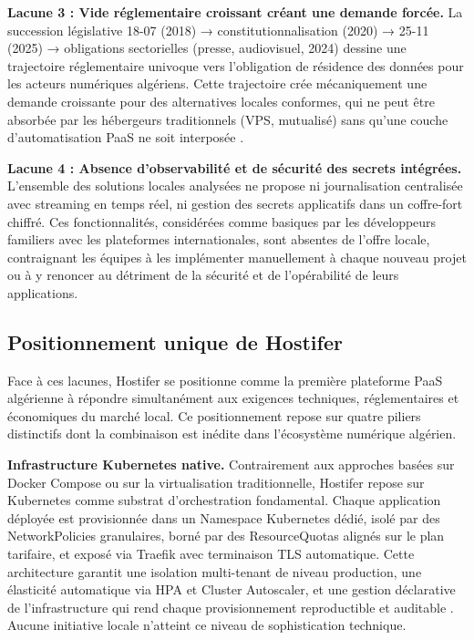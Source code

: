 \textbf{Lacune 3 : Vide réglementaire croissant créant une demande forcée.} La succession législative 18-07 (2018) → constitutionnalisation (2020) → 25-11 (2025) → obligations sectorielles (presse, audiovisuel, 2024) dessine une trajectoire réglementaire univoque vers l'obligation de résidence des données pour les acteurs numériques algériens. Cette trajectoire crée mécaniquement une demande croissante pour des alternatives locales conformes, qui ne peut être absorbée par les hébergeurs traditionnels (VPS, mutualisé) sans qu'une couche d'automatisation PaaS ne soit interposée \cite{loi-25-11-guide}.

\textbf{Lacune 4 : Absence d'observabilité et de sécurité des secrets intégrées.} L'ensemble des solutions locales analysées ne propose ni journalisation centralisée avec streaming en temps réel, ni gestion des secrets applicatifs dans un coffre-fort chiffré. Ces fonctionnalités, considérées comme basiques par les développeurs familiers avec les plateformes internationales, sont absentes de l'offre locale, contraignant les équipes à les implémenter manuellement à chaque nouveau projet ou à y renoncer au détriment de la sécurité et de l'opérabilité de leurs applications.

\subsection*{Positionnement unique de Hostifer}

Face à ces lacunes, Hostifer se positionne comme la première plateforme PaaS algérienne à répondre simultanément aux exigences techniques, réglementaires et économiques du marché local. Ce positionnement repose sur quatre piliers distinctifs dont la combinaison est inédite dans l'écosystème numérique algérien.

\textbf{Infrastructure Kubernetes native.} Contrairement aux approches basées sur Docker Compose ou sur la virtualisation traditionnelle, Hostifer repose sur Kubernetes comme substrat d'orchestration fondamental. Chaque application déployée est provisionnée dans un Namespace Kubernetes dédié, isolé par des NetworkPolicies granulaires, borné par des ResourceQuotas alignés sur le plan tarifaire, et exposé via Traefik avec terminaison TLS automatique. Cette architecture garantit une isolation multi-tenant de niveau production, une élasticité automatique via HPA et Cluster Autoscaler, et une gestion déclarative de l'infrastructure qui rend chaque provisionnement reproductible et auditable \cite{k8s-concepts}. Aucune initiative locale n'atteint ce niveau de sophistication technique.

